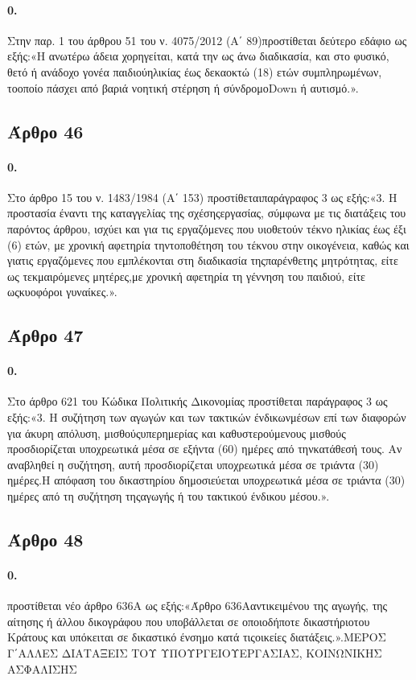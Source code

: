 \documentclass[a4paper,oneside, 10pt]{book}
\begin{document}
\paragraph { 0. } Στην παρ. 1 του άρθρου 51 του ν. 4075/2012 (Α΄ 89)προστίθεται δεύτερο εδάφιο ως εξής:«Η ανωτέρω άδεια χορηγείται, κατά την ως άνω διαδικασία, και στο φυσικό, θετό ή ανάδοχο γονέα παιδιούηλικίας έως δεκαοκτώ (18) ετών συμπληρωμένων, τοοποίο πάσχει από βαριά νοητική στέρηση ή σύνδρομοDown ή αυτισμό.».
\subsection*{ Άρθρο 46 }
\paragraph { 0. } Στο άρθρο 15 του ν. 1483/1984 (Α΄ 153) προστίθεταιπαράγραφος 3 ως εξής:«3. Η προστασία έναντι της καταγγελίας της σχέσηςεργασίας, σύμφωνα με τις διατάξεις του παρόντος άρθρου, ισχύει και για τις εργαζόμενες που υιοθετούν τέκνο ηλικίας έως έξι (6) ετών, με χρονική αφετηρία τηντοποθέτηση του τέκνου στην οικογένεια, καθώς και γιατις εργαζόμενες που εμπλέκονται στη διαδικασία τηςπαρένθετης μητρότητας, είτε ως τεκμαιρόμενες μητέρες,με χρονική αφετηρία τη γέννηση του παιδιού, είτε ωςκυοφόροι γυναίκες.».
\subsection*{ Άρθρο 47 }
\paragraph { 0. } Στο άρθρο 621 του Κώδικα Πολιτικής Δικονομίας προστίθεται παράγραφος 3 ως εξής:«3. Η συζήτηση των αγωγών και των τακτικών ένδικωνμέσων επί των διαφορών για άκυρη απόλυση, μισθούςυπερημερίας και καθυστερούμενους μισθούς προσδιορίζεται υποχρεωτικά μέσα σε εξήντα (60) ημέρες από τηνκατάθεσή τους. Αν αναβληθεί η συζήτηση, αυτή προσδιορίζεται υποχρεωτικά μέσα σε τριάντα (30) ημέρες.Η απόφαση του δικαστηρίου δημοσιεύεται υποχρεωτικά μέσα σε τριάντα (30) ημέρες από τη συζήτηση τηςαγωγής ή του τακτικού ένδικου μέσου.».
\subsection*{ Άρθρο 48 }
\paragraph { 0. } προστίθεται νέο άρθρο 636Α ως εξής:«Άρθρο 636Ααντικειμένου της αγωγής, της αίτησης ή άλλου δικογράφου που υποβάλλεται σε οποιοδήποτε δικαστήριοτου Κράτους και υπόκειται σε δικαστικό ένσημο κατά τιςοικείες διατάξεις.».ΜΕΡΟΣ Γ΄ΑΛΛΕΣ ΔΙΑΤΑΞΕΙΣ ΤΟΥ ΥΠΟΥΡΓΕΙΟΥΕΡΓΑΣΙΑΣ, ΚΟΙΝΩΝΙΚΗΣ ΑΣΦΑΛΙΣΗΣ
\end{document}
